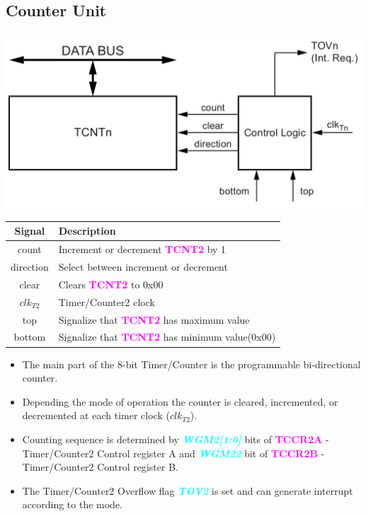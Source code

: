 \documentclass{article}
\newcommand{\bitFormat}[1]{\emph{\textbf{\textcolor{cyan}{#1}}}}
\newcommand{\regFormat}[1]{\textbf{\textcolor{magenta}{#1}}}
\begin{document}
\subsection{Counter Unit}
\begin{minipage}{0.5\textwidth}
    \includegraphics[width=1\textwidth]{Timer0CounterUnit.png}
\end{minipage}
\begin{minipage}{0.45\textwidth}
    \begin{tabular}{c|p{5.5cm}}
        \textbf{Signal} & \textbf{Description}\\
        \hline  
        count & Increment or decrement \regFormat{TCNT2} by 1\\
        direction & Select between increment or decrement\\
        clear & Clears \regFormat{TCNT2} to 0x00\\
        $clk_{T2}$ & Timer/Counter2 clock\\
        top & Signalize that \regFormat{TCNT2} has maximum value\\
        bottom & Signalize that \regFormat{TCNT2} has minimum value(0x00)\\
    \end{tabular}
\end{minipage}
\begin{itemize}
    \item The main part of the 8-bit Timer/Counter is the programmable bi-directional counter.
    \item Depending the mode of operation the counter is cleared, incremented, or decremented at each timer clock ($clk_{T2}$).
    \item Counting sequence is determined by \bitFormat{WGM2[1:0]} bits of \regFormat{TCCR2A} -Timer/Counter2 Control register A and \bitFormat{WGM22} bit of \regFormat{TCCR2B} - Timer/Counter2 Control register B.
    \item The Timer/Counter2 Overflow flag \bitFormat{TOV2} is set and can generate interrupt according to the mode.
\end{itemize}
\end{document}

